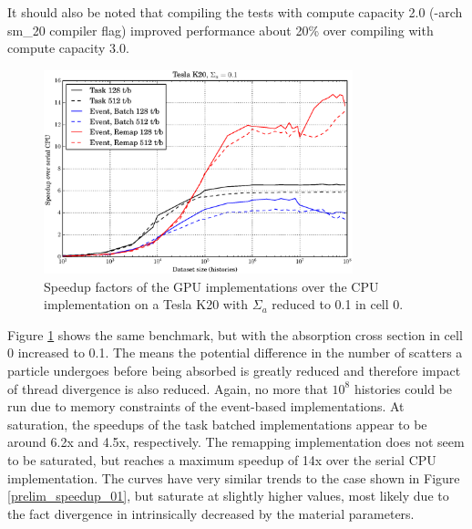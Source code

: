 It should also be noted that compiling the tests with compute capacity 2.0 (-arch sm\_20 compiler flag) improved performance about 20\% over compiling with compute capacity 3.0.

\begin{figure}[h!] 
  \centering
    \includegraphics[width=0.8\textwidth]{graphics/prelim_speedup_01_k20.eps}
     \caption{Speedup factors of the GPU implementations over the CPU implementation on a Tesla K20 with $\Sigma_a$ reduced to 0.1 in cell 0. \label{prelim_speedup_1} }
\end{figure}

Figure \ref{prelim_speedup_1} shows the same benchmark, but with the absorption cross section in cell 0 increased to 0.1.  The means the potential difference in the number of scatters a particle undergoes before being absorbed is greatly reduced and therefore impact of thread divergence is also reduced.  Again, no more that $10^8$ histories could be run due to memory constraints of the event-based implementations.  At saturation, the speedups of the task batched implementations appear to be around 6.2x and 4.5x, respectively.  The remapping implementation does not seem to be saturated, but reaches a maximum speedup of 14x over the serial CPU implementation.  The curves have very similar trends to the case shown in Figure \ref{prelim_speedup_01}, but saturate at slightly higher values, most likely due to the fact divergence in intrinsically decreased by the material parameters.

